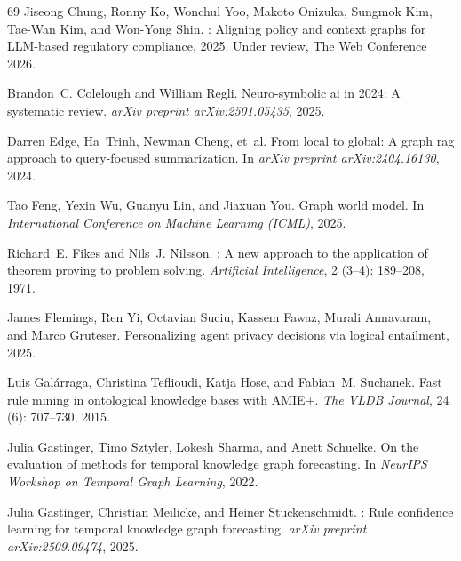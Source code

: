 \documentclass[11pt]{article}
\theoremstyle{plain}
\begin{document}
{\begin{thebibliography}{69}
Jiseong Chung, Ronny Ko, Wonchul Yoo, Makoto Onizuka, Sungmok Kim, Tae-Wan Kim,
  and Won-Yong Shin.
: Aligning policy and context graphs for {LLM}-based
  regulatory compliance, 2025.
\newblock Under review, The Web Conference 2026.

Brandon~C. Colelough and William Regli.
\newblock Neuro-symbolic ai in 2024: A systematic review.
\newblock \emph{arXiv preprint arXiv:2501.05435}, 2025.

Darren Edge, Ha~Trinh, Newman Cheng, et~al.
\newblock From local to global: A graph rag approach to query-focused
  summarization.
\newblock In \emph{arXiv preprint arXiv:2404.16130}, 2024.

Tao Feng, Yexin Wu, Guanyu Lin, and Jiaxuan You.
\newblock Graph world model.
\newblock In \emph{International Conference on Machine Learning (ICML)}, 2025.

Richard~E. Fikes and Nils~J. Nilsson.
: A new approach to the application of theorem proving to
  problem solving.
\newblock \emph{Artificial Intelligence}, 2 (3--4): 189--208,
  1971.

James Flemings, Ren Yi, Octavian Suciu, Kassem Fawaz, Murali Annavaram, and
  Marco Gruteser.
\newblock Personalizing agent privacy decisions via logical entailment, 2025.

Luis Gal{\'a}rraga, Christina Teflioudi, Katja Hose, and Fabian~M. Suchanek.
\newblock Fast rule mining in ontological knowledge bases with {AMIE+}.
\newblock \emph{The VLDB Journal}, 24 (6): 707--730, 2015.

Julia Gastinger, Timo Sztyler, Lokesh Sharma, and Anett Schuelke.
\newblock On the evaluation of methods for temporal knowledge graph
  forecasting.
\newblock In \emph{NeurIPS Workshop on Temporal Graph Learning}, 2022.

Julia Gastinger, Christian Meilicke, and Heiner Stuckenschmidt.
: Rule confidence learning for temporal knowledge graph
  forecasting.
\newblock \emph{arXiv preprint arXiv:2509.09474}, 2025.


\end{thebibliography}}
\end{document}
